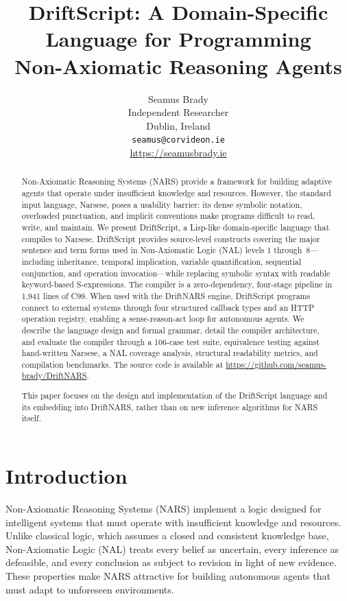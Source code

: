 \documentclass[11pt,a4paper]{article}
\title{DriftScript: A Domain-Specific Language for Programming\\Non-Axiomatic Reasoning Agents}
\author{
  Seamus Brady\\
  Independent Researcher\\
  Dublin, Ireland\\
  \texttt{seamus@corvideon.ie}\\
  \url{https://seamusbrady.ie}
}
\date{}
\begin{document}
\maketitle

\begin{abstract}
Non-Axiomatic Reasoning Systems (NARS) provide a framework for building
adaptive agents that operate under insufficient knowledge and resources.
However, the standard input language, Narsese, poses a usability barrier: its
dense symbolic notation, overloaded punctuation, and implicit conventions make
programs difficult to read, write, and maintain. We present DriftScript, a
Lisp-like domain-specific language that compiles to Narsese. DriftScript
provides source-level constructs covering the major sentence and term forms
used in Non-Axiomatic Logic (NAL) levels 1 through~8---including inheritance,
temporal implication, variable quantification, sequential conjunction, and
operation invocation---while replacing symbolic syntax with readable
keyword-based S-expressions. The compiler is a zero-dependency, four-stage
pipeline in 1{,}941 lines of C99. When used with the DriftNARS engine,
DriftScript programs connect to external systems through four structured
callback types and an HTTP operation registry, enabling a sense-reason-act
loop for autonomous agents. We describe the language design and formal grammar,
detail the compiler architecture, and evaluate the compiler through a 106-case
test suite, equivalence testing against hand-written Narsese, a NAL coverage
analysis, structural readability metrics, and compilation benchmarks. The
source code is available at
\url{https://github.com/seamus-brady/DriftNARS}.

This paper focuses on the design and implementation of the DriftScript
language and its embedding into DriftNARS, rather than on new inference
algorithms for NARS itself.
\end{abstract}

\section{Introduction}

Non-Axiomatic Reasoning Systems (NARS) \citep{wang2006rigid, wang2013non}
implement a logic designed for intelligent systems that must operate with
insufficient knowledge and resources. Unlike classical logic, which assumes a
closed and consistent knowledge base, Non-Axiomatic Logic (NAL) treats every
belief as uncertain, every inference as defeasible, and every conclusion as
subject to revision in light of new evidence. These properties make NARS
attractive for building autonomous agents that must adapt to unforeseen
environments.
\end{document}
